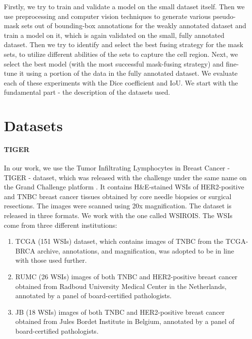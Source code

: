 Firstly, we try to train and validate a model on the small dataset itself. Then we use preprocessing and computer vision techniques to generate various pseudo-mask sets out of bounding-box annotations for the weakly annotated dataset and train a model on it, which is again validated on the small, fully annotated dataset. Then we try to identify and select the best fusing strategy for the mask sets, to utilize different abilities of the sets to capture the cell region. Next, we select the best model (with the most successful mask-fusing strategy) and fine-tune it using a portion of the data in the fully annotated dataset. We evaluate each of these experiments with the Dice coefficient and IoU. We start with the fundamental part - the description of the datasets used.

\section{Datasets}
\label{sec:datasets}

\paragraph{TIGER} In our work, we use the Tumor Infiltrating Lymphocytes in Breast Cancer - TIGER - dataset, which was released with the challenge under the same name on the Grand Challenge platform \cite{tiger_dataset}. It contains H\&E-stained WSIs of HER2-positive and TNBC breast cancer tissues obtained by core needle biopsies or surgical resections. The images were scanned using 20x magnification. The dataset is released in three formats. We work with the one called WSIROIS. The WSIs come from three different institutions:

\begin{enumerate}
    \item TCGA (151 WSIs) dataset, which contains images of TNBC from the TCGA-BRCA archive, annotations, and magnification, was adopted to be in line with those used further.
    \item RUMC (26 WSIs) images of both TNBC and HER2-positive breast cancer obtained from Radboud University Medical Center in the Netherlands, annotated by a panel of board-certified pathologists.
    \item JB (18 WSIs) images of both TNBC and HER2-positive breast cancer obtained from Jules Bordet Institute in Belgium, annotated by a panel of board-certified pathologists.
\end{enumerate}

